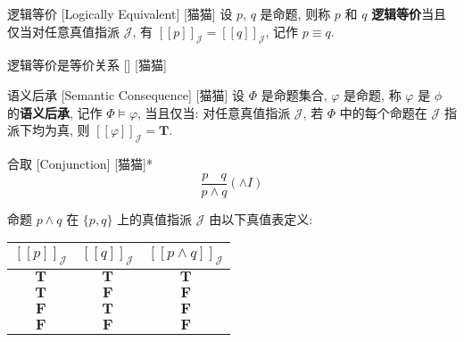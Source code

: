 \documentclass[UTF8]{ctexart}
\newcommand{\LT}{\ensuremath{\mathbf{T}}}
\newcommand{\LF}{\ensuremath{\mathbf{F}}}
\newcommand{\assign}[2]{\ensuremath{{[\![#1]\!]}_{#2}}}
\begin{document}
            \begin{dfn}
                {逻辑等价}
                [Logically Equivalent]
                [猫猫]
                设 \(p\), \(q\) 是命题, 则称 \(p\) 和 \(q\) \textbf{逻辑等价}当且仅当对任意真值指派 \(\mathcal{J}\), 有 \(\assign{p}{\mathcal{J}}=\assign{q}{\mathcal{J}}\), 记作 \(p\equiv q\). 
            \end{dfn}

            \begin{ppt}
                []
                {逻辑等价是等价关系}
                []
                [猫猫]
            \end{ppt}

            \begin{dfn}
                []
                {语义后承}
                [Semantic Consequence]
                [猫猫]
                设 \(\Phi\) 是命题集合, \(\varphi\) 是命题, 称 \(\varphi\) 是 \(\phi\) 的\textbf{语义后承}, 记作 \(\Phi\models\varphi\), 当且仅当: 对任意真值指派 \(\mathcal{J}\), 若 \(\Phi\) 中的每个命题在 \(\mathcal{J}\) 指派下均为真, 则 \(\assign{\varphi}{\mathcal{J}}=\LT\).  
            \end{dfn}

            \begin{rul}
                [Conjunction]
                {合取}
                [Conjunction]
                [猫猫]*
                \[\frac{p\quad q}{p\land q}(\land I)\]
            \end{rul}

            \begin{rmk}
                [猫猫]
                命题 \(p\land q\) 在 \(\{p,q\}\) 上的真值指派 \(\mathcal{J}\) 由以下真值表定义: 
                \begin{center}
                \begin{tabular}{|c|c|c|}
                    \hline
                    \(\assign{p}{\mathcal{J}}\) & \(\assign{q}{\mathcal{J}}\) & \(\assign{p\land q}{\mathcal{J}}\) \\
                    \hline
                    \LT & \LT & \LT \\
                    \LT & \LF & \LF \\
                    \LF & \LT & \LF \\
                    \LF & \LF & \LF \\
                    \hline
                \end{tabular}
                \end{center}
            \end{rmk}
\end{document}
